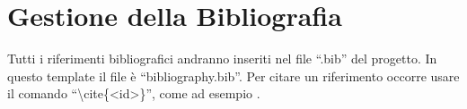 \section{Gestione della Bibliografia}
Tutti i riferimenti bibliografici andranno inseriti nel file ``.bib'' del progetto. In questo template il file è ``bibliography.bib''. Per citare un riferimento occorre usare il comando ``\textbackslash cite\{<id>\}'', come ad esempio \cite{vaswani2017attention}.